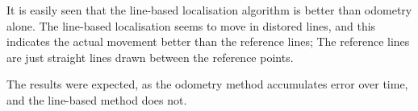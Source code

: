 It is easily seen that the line-based localisation algorithm is better than odometry alone.
The line-based localisation seems to move in distored lines, and this indicates the actual movement
better than the reference lines; The reference lines are just straight lines drawn between the reference points.


The results were expected, as the odometry method accumulates error over time, and the line-based method does not.